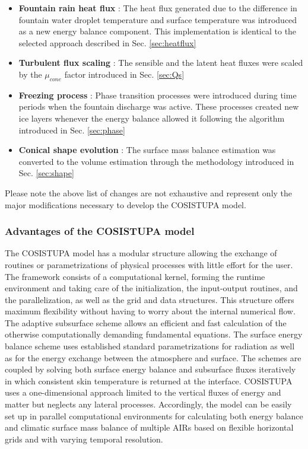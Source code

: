 \begin{itemize}

	\item \textbf{Fountain rain heat flux} : The heat flux generated due to the difference in fountain water droplet
	      temperature and surface temperature was introduced as a new energy balance component. This implementation is
	      identical to the selected approach described in Sec. \ref{sec:heatflux}

	\item \textbf{Turbulent flux scaling} : The sensible and the latent heat fluxes were scaled by the $\mu_{cone}$ factor
	      introduced in Sec. \ref{sec:Qs}

	\item \textbf{Freezing process} : Phase transition processes were introduced during time periods when the fountain
	      discharge was active. These processes created new ice layers whenever the energy balance allowed it
	      following the algorithm introduced in Sec. \ref{sec:phase}

	\item \textbf{Conical shape evolution} : The surface mass balance estimation was converted to the volume estimation
	      through the methodology introduced in Sec. \ref{sec:shape}

\end{itemize}

Please note the above list of changes are not exhaustive and represent only the major modifications necessary to
develop the COSISTUPA model.

\subsubsection{Advantages of the COSISTUPA model}

The COSISTUPA model has a modular structure allowing the exchange of routines or parametrizations of physical
processes with little effort for the user. The framework consists of a computational kernel, forming
the runtime environment and taking care of the initialization, the input-output routines, and the
parallelization, as well as the grid and data structures. This structure offers maximum flexibility without
having to worry about the internal numerical flow. The adaptive subsurface scheme allows an efficient and fast
calculation of the otherwise computationally demanding fundamental equations. The surface energy balance scheme
uses established standard parametrizations for radiation as well as for the energy exchange between the
atmosphere and surface. The schemes are coupled by solving both surface energy balance and subsurface fluxes
iteratively in which consistent skin temperature is returned at the interface. COSISTUPA uses a one-dimensional
approach limited to the vertical fluxes of energy and matter but neglects any lateral processes. Accordingly,
the model can be easily set up in parallel computational environments for calculating both energy balance and
climatic surface mass balance of multiple \ac{AIRs} based on flexible horizontal grids and with varying temporal
resolution.

